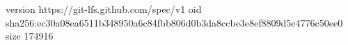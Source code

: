 version https://git-lfs.github.com/spec/v1
oid sha256:ec30a08ea6511b348950a6c84fbb806d0b3da8ccbe3e8ef8809d5e4776c50ee0
size 174916
